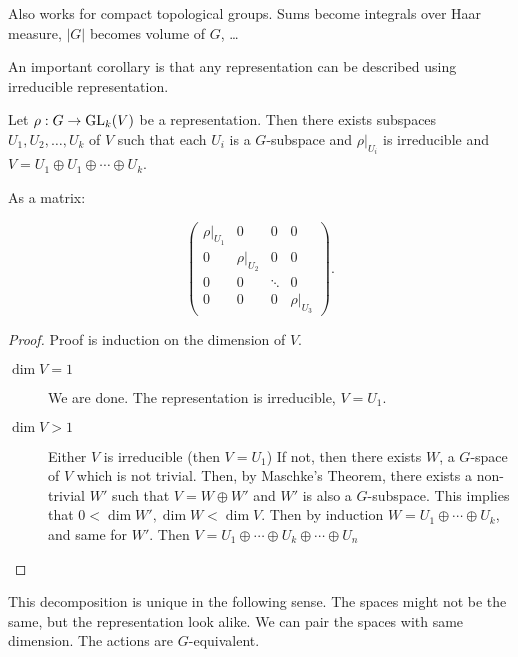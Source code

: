 \begin{remark}
    Also works for compact topological groups.
    Sums become integrals over Haar measure, $|G|$ becomes volume of $G$, \ldots
\end{remark}



An important corollary is that any representation can be described using irreducible representation.

\begin{theorem}[2.14]
    Let $\rho: G \to  \operatorname{GL}_k(V)$ be a representation.
    Then there exists subspaces $U_1, U_2, \ldots, U_k$ of $V$ such that each $U_i$ is a  $G$-subspace and $\rho|_{U_i}$ is irreducible and $V = U_1 \oplus U_1 \oplus \cdots \oplus U_k$.
\end{theorem}

As a matrix:

\[
\begin{pmatrix}
    \rho|_{U_1} & 0 &0 &0\\
    0 & \rho|_{U_2} & 0&0\\
    0 & 0& \ddots & 0\\
    0 & 0 &0&\rho|_{U_3} 
\end{pmatrix}
.\] 

\begin{proof}
    Proof is induction on the dimension of $V$.

    \begin{description}
        \item[$\dim V = 1$] We are done. The representation is irreducible, $V = U_1$.
        \item [$\dim V > 1$] Either $V$ is irreducible (then $V = U_1$)
            If not, then there exists $W$, a $G$-space of $V$ which is not trivial.
            Then, by Maschke's Theorem, there exists a non-trivial $W'$ such that  $V = W \oplus W'$ and $W'$ is also a  $G$-subspace.
            This implies that $0 < \dim W', \dim W < \dim V$.
            Then by induction  $W = U_1 \oplus \cdots \oplus U_k$, and same for $W'$.
            Then $V = U_1 \oplus \cdots \oplus U_k \oplus \cdots \oplus U_n$
    \end{description}
\end{proof}


This decomposition is unique in the following sense.
The spaces might not be the same, but the representation look alike.
We can pair the spaces with same dimension. The actions are $G$-equivalent.

